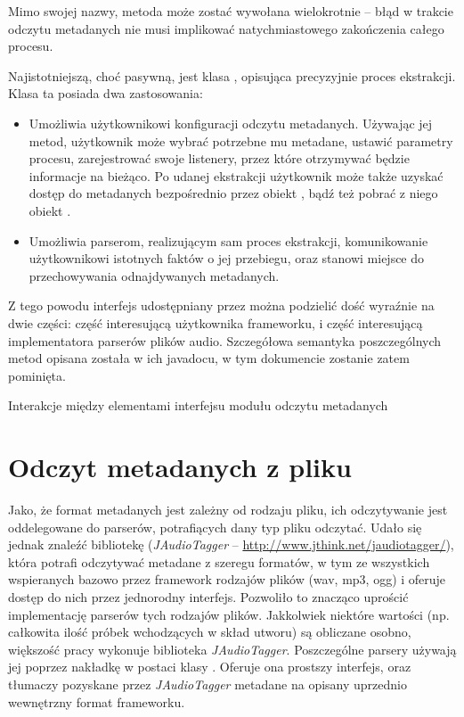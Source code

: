 \begin{Note}
Mimo swojej nazwy, metoda  może zostać wywołana wielokrotnie -- błąd w trakcie odczytu
metadanych nie musi implikować natychmiastowego zakończenia całego procesu.
\end{Note}


Najistotniejszą, choć pasywną, jest klasa , opisująca precyzyjnie proces
ekstrakcji. Klasa ta posiada dwa zastosowania:

\begin{itemize}

  \item Umożliwia użytkownikowi konfiguracji odczytu metadanych. Używając jej metod, użytkownik może
    wybrać potrzebne mu metadane, ustawić parametry procesu, zarejestrować swoje listenery, przez
    które otrzymywać będzie informacje na bieżąco. Po udanej ekstrakcji użytkownik może także
    uzyskać dostęp do metadanych bezpośrednio przez obiekt , bądź też pobrać
    z niego obiekt .

  \item Umożliwia parserom, realizującym sam proces ekstrakcji, komunikowanie użytkownikowi
    istotnych faktów o jej przebiegu, oraz stanowi miejsce do przechowywania odnajdywanych
    metadanych.

\end{itemize}

Z tego powodu interfejs udostępniany przez  można podzielić dość wyraźnie na
dwie części: część interesującą użytkownika frameworku, i część interesującą implementatora parserów
plików audio. Szczegółowa semantyka poszczególnych metod opisana została w ich javadocu, w tym
dokumencie zostanie zatem pominięta.

{Interakcje między elementami interfejsu modułu odczytu metadanych}


\section{Odczyt metadanych z pliku}
\label{sec:metadane_odczyt}

Jako, że format metadanych jest zależny od rodzaju pliku, ich odczytywanie jest oddelegowane do
parserów, potrafiących dany typ pliku odczytać. Udało się jednak znaleźć bibliotekę
(\emph{JAudioTagger} -- \url{http://www.jthink.net/jaudiotagger/}), która potrafi odczytywać
metadane z szeregu formatów, w tym ze wszystkich wspieranych bazowo przez framework rodzajów plików
(wav, mp3, ogg) i oferuje dostęp do nich przez jednorodny interfejs. Pozwoliło to znacząco uprościć
implementację parserów tych rodzajów plików.  Jakkolwiek niektóre wartości (np. całkowita ilość
próbek wchodzących w skład utworu) są obliczane osobno, większość pracy wykonuje biblioteka
\emph{JAudioTagger}. Poszczególne parsery używają jej poprzez nakładkę w postaci klasy
. Oferuje ona prostszy interfejs, oraz tłumaczy pozyskane przez
\emph{JAudioTagger} metadane na opisany uprzednio wewnętrzny format frameworku.


